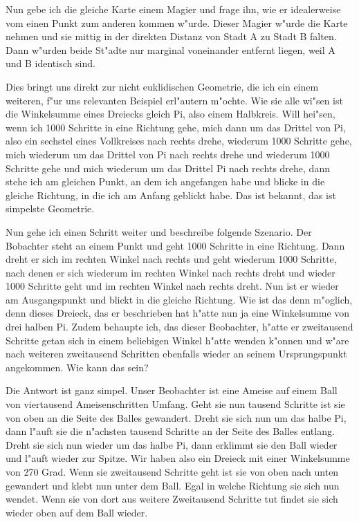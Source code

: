 \documentclass[a5paper,8pt]{book}
\begin{document}
Nun gebe ich die gleiche Karte einem Magier und frage ihn, wie er idealerweise vom einen Punkt zum anderen kommen w"urde. Dieser Magier w"urde die Karte nehmen und sie mittig in der direkten Distanz von Stadt A zu Stadt B falten. Dann w"urden beide St"adte nur marginal voneinander entfernt liegen, weil A und B identisch sind.

Dies bringt uns direkt zur nicht euklidischen Geometrie, die ich ein einem weiteren, f"ur uns relevanten Beispiel erl"autern m"ochte. Wie sie alle wi"sen ist die Winkelsumme eines Dreiecks gleich Pi, also einem Halbkreis. Will hei"sen, wenn ich 1000 Schritte in eine Richtung gehe, mich dann um das Drittel von Pi, also ein sechstel eines Vollkreises nach rechts drehe, wiederum 1000 Schritte gehe, mich wiederum um das Drittel von Pi nach rechts drehe und wiederum 1000 Schritte gehe und mich wiederum um das Drittel Pi nach rechts drehe, dann stehe ich am gleichen Punkt, an dem ich angefangen habe und blicke in die gleiche Richtung, in die ich am Anfang geblickt habe.
Das ist bekannt, das ist simpelste Geometrie.

Nun gehe ich einen Schritt weiter und beschreibe folgende Szenario. Der Bobachter steht an einem Punkt und geht 1000 Schritte in eine Richtung. Dann dreht er sich im rechten Winkel nach rechts und geht wiederum 1000 Schritte, nach denen er sich wiederum im rechten Winkel nach rechts dreht und wieder 1000 Schritte geht und im rechten Winkel nach rechts dreht. Nun ist er wieder am Ausgangspunkt und blickt in die gleiche Richtung. Wie ist das denn m"oglich, denn dieses Dreieck, das er beschrieben hat h"atte nun ja eine Winkelsumme von drei halben Pi.
Zudem behaupte ich, das dieser Beobachter, h"atte er zweitausend Schritte getan sich in einem beliebigen Winkel h"atte wenden k"onnen und w"are nach weiteren zweitausend Schritten ebenfalls wieder an seinem Ursprungspunkt angekommen.
Wie kann das sein?

Die Antwort ist ganz simpel. Unser Beobachter ist eine Ameise auf einem Ball von viertausend Ameisenschritten Umfang. Geht sie nun tausend Schritte ist sie von oben an die Seite des Balles gewandert. Dreht sie sich nun um das halbe Pi, dann l"auft sie die n"achsten tausend Schritte an der Seite des Balles entlang. Dreht sie sich nun wieder um das halbe Pi, dann erklimmt sie den Ball wieder und l"auft wieder zur Spitze. Wir haben also ein Dreieck mit einer Winkelsumme von 270 Grad.
Wenn sie zweitausend Schritte geht ist sie von oben nach unten gewandert und klebt nun unter dem Ball. Egal in welche Richtung sie sich nun wendet. Wenn sie von dort aus weitere Zweitausend Schritte tut findet sie sich wieder oben auf dem Ball wieder.
\end{document}

